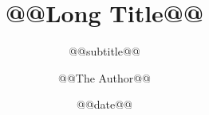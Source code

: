 
\usepackage[utf8]{luainputenc}
\usepackage[no-math]{fontspec}
\usepackage{babel}


\setmainfont{Helvetica}
\setsansfont{Helvetica} %
\usepackage{MnSymbol} %


\title[@@Short Title@@]{@@Long Title@@}

\subtitle{@@subtitle@@}

\author{@@The Author@@}


\date{@@date@@}


